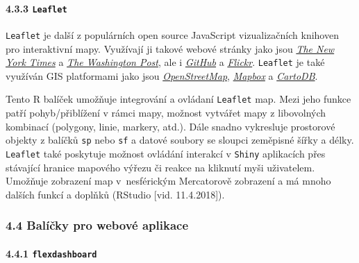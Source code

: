 \documentclass[12pt,]{article}
\let\oldparagraph\paragraph
\renewcommand{\paragraph}[1]{\oldparagraph{#1}\mbox{}}
\begin{document}
\vspace*{-0.4cm}

\hypertarget{leaflet}{\paragraph{\texorpdfstring{4.3.3
\texttt{Leaflet}}{4.3.3 Leaflet}}\label{leaflet}}

\qquad \texttt{Leaflet} je další z populárních open source JavaScript
vizualizačních knihoven pro interaktivní mapy. Využívají ji takové
webové stránky jako jsou
\href{http://www.nytimes.com/projects/elections/2013/nyc-primary/mayor/map.html}{\emph{The
New York Times}} a
\href{http://www.washingtonpost.com/sf/local/2013/11/09/washington-a-world-apart/?utm_term=.906188040dc1}{\emph{The
Washington Post}}, ale i
\href{https://blog.github.com/2013-06-13-there-s-a-map-for-that/}{\emph{GitHub}}
a \href{https://www.flickr.com/map}{\emph{Flickr}}. \texttt{Leaflet} je
také využíván GIS platformami jako jsou
\href{http://www.openstreetmap.org/\#map=7/49.714/15.060}{\emph{OpenStreetMap}},
\href{https://www.mapbox.com/}{\emph{Mapbox}} a
\href{https://carto.com/}{\emph{CartoDB}}.

\qquad Tento R balíček umožňuje integrování a ovládaní \texttt{Leaflet}
map. Mezi jeho funkce patří pohyb/přiblížení v rámci mapy, možnost
vytvářet mapy z libovolných kombinací (polygony, linie, markery, atd.).
Dále snadno vykresluje prostorové objekty z balíčků \texttt{sp} nebo
\texttt{sf} a datové soubory se sloupci zeměpisné šířky a délky.
\texttt{Leaflet} také poskytuje možnost ovládání interakcí v
\texttt{Shiny} aplikacích přes stávající hranice mapového výřezu či
reakce na kliknutí myši uživatelem. Umožňuje zobrazení map v~nesférickým
Mercatorově zobrazení a má mnoho dalších funkcí a doplňků (RStudio
{[}vid. 11.4.2018{]}). \vspace*{-0.2cm}

\hypertarget{webviz}{\subsubsection{4.4 Balíčky pro webové
aplikace}\label{webviz}}

\paragraph{\texorpdfstring{4.4.1
\texttt{flexdashboard}}{4.4.1 flexdashboard}}\label{flexdashboard}
\end{document}
